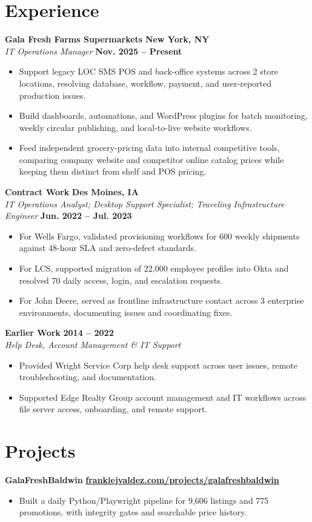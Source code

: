 \documentclass[10pt,letterpaper]{article}
\newcommand{\resumeTitle}[1]{{\fontsize{9.65}{11.35}\selectfont\textbf{#1}}}
\newcommand{\resumeSubTitle}[1]{{\fontsize{9.45}{11.15}\selectfont\textit{#1}}}
\newcommand{\resumeRole}[4]{
  \resumeTitle{#1} \hfill \resumeTitle{#2}\\
  \resumeSubTitle{#3} \hfill \resumeTitle{#4}
}
\newcommand{\resumeCompactRole}[3]{
  \resumeTitle{#1} \hfill \resumeTitle{#2}\\
  \resumeSubTitle{#3}
}
\begin{document}
\section*{Experience}
\resumeRole{Gala Fresh Farms Supermarkets}{New York, NY}{IT Operations Manager}{Nov. 2025 -- Present}
\begin{itemize}
  \item Support legacy LOC SMS POS and back-office systems across 2 store locations, resolving database, workflow, payment, and user-reported production issues.
  \item Build dashboards, automations, and WordPress plugins for batch monitoring, weekly circular publishing, and local-to-live website workflows.
  \item Feed independent grocery-pricing data into internal competitive tools, comparing company website and competitor online catalog prices while keeping them distinct from shelf and POS pricing.
\end{itemize}

\resumeRole{Contract Work}{Des Moines, IA}{IT Operations Analyst; Desktop Support Specialist; Traveling Infrastructure Engineer}{Jun. 2022 -- Jul. 2023}
\begin{itemize}
  \item For Wells Fargo, validated provisioning workflows for 600 weekly shipments against 48-hour SLA and zero-defect standards.
  \item For LCS, supported migration of 22,000 employee profiles into Okta and resolved 70 daily access, login, and escalation requests.
  \item For John Deere, served as frontline infrastructure contact across 3 enterprise environments, documenting issues and coordinating fixes.
\end{itemize}

\resumeCompactRole{Earlier Work}{2014 -- 2022}{Help Desk, Account Management \& IT Support}
\begin{itemize}
  \item Provided Wright Service Corp help desk support across user issues, remote troubleshooting, and documentation.
  \item Supported Edge Realty Group account management and IT workflows across file server access, onboarding, and remote support.
\end{itemize}

\section*{Projects}
\resumeTitle{GalaFreshBaldwin} \hfill \href{https://frankiejvaldez.com/projects/galafreshbaldwin/}{\resumeTitle{frankiejvaldez.com/projects/galafreshbaldwin}}
\begin{itemize}
  \item Built a daily Python/Playwright pipeline for 9,606 listings and 775 promotions, with integrity gates and searchable price history.
\end{itemize}
\end{document}
